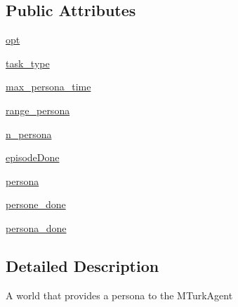 \subsection*{Public Attributes}
\begin{DoxyCompactItemize}
\item 
\hyperlink{classparlai_1_1mturk_1_1tasks_1_1personachat_1_1personachat__collect__personas_1_1worlds_1_1PersonaProfileWorld_aacd506fe7f9a62c37a109a8896e6ddca}{opt}
\item 
\hyperlink{classparlai_1_1mturk_1_1tasks_1_1personachat_1_1personachat__collect__personas_1_1worlds_1_1PersonaProfileWorld_a5d3fcb3260cb4234fead9654ab40f150}{task\+\_\+type}
\item 
\hyperlink{classparlai_1_1mturk_1_1tasks_1_1personachat_1_1personachat__collect__personas_1_1worlds_1_1PersonaProfileWorld_a5f66f5e14283cfc9109a2619b77f2db8}{max\+\_\+persona\+\_\+time}
\item 
\hyperlink{classparlai_1_1mturk_1_1tasks_1_1personachat_1_1personachat__collect__personas_1_1worlds_1_1PersonaProfileWorld_a07ffad4bebade8273b53f84c6bd22ccf}{range\+\_\+persona}
\item 
\hyperlink{classparlai_1_1mturk_1_1tasks_1_1personachat_1_1personachat__collect__personas_1_1worlds_1_1PersonaProfileWorld_ac84651f7191a3795d1b38ec079990e97}{n\+\_\+persona}
\item 
\hyperlink{classparlai_1_1mturk_1_1tasks_1_1personachat_1_1personachat__collect__personas_1_1worlds_1_1PersonaProfileWorld_a37e013e79d7dc8663813dc45340ea9a0}{episode\+Done}
\item 
\hyperlink{classparlai_1_1mturk_1_1tasks_1_1personachat_1_1personachat__collect__personas_1_1worlds_1_1PersonaProfileWorld_a72c1b807bd5675177bd2bbaaee26ca1f}{persona}
\item 
\hyperlink{classparlai_1_1mturk_1_1tasks_1_1personachat_1_1personachat__collect__personas_1_1worlds_1_1PersonaProfileWorld_a0182ad14116156b32f38ae4f4d3dff29}{persone\+\_\+done}
\item 
\hyperlink{classparlai_1_1mturk_1_1tasks_1_1personachat_1_1personachat__collect__personas_1_1worlds_1_1PersonaProfileWorld_a64146427708eb1b226fea0da11ab21e7}{persona\+\_\+done}
\end{DoxyCompactItemize}


\subsection{Detailed Description}
\begin{DoxyVerb}A world that provides a persona to the MTurkAgent\end{DoxyVerb}
 

